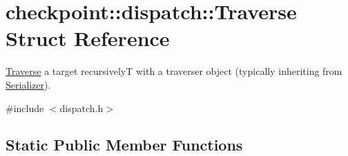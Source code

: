 \hypertarget{structcheckpoint_1_1dispatch_1_1_traverse}{}\section{checkpoint\+:\+:dispatch\+:\+:Traverse Struct Reference}
\label{structcheckpoint_1_1dispatch_1_1_traverse}


\hyperlink{structcheckpoint_1_1dispatch_1_1_traverse}{Traverse} a target recursively{\ttfamily T} with a traverser object (typically inheriting from {\ttfamily \hyperlink{structcheckpoint_1_1_serializer}{Serializer}}).  




{\ttfamily \#include $<$dispatch.\+h$>$}

\subsection*{Static Public Member Functions}
